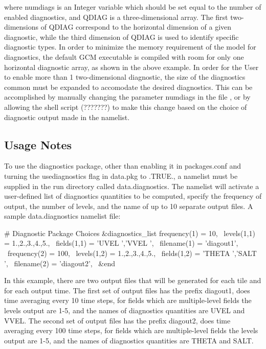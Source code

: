 where numdiags is an Integer variable which should be
set equal to the number of enabled diagnostics, and QDIAG is a three-dimensional
array.  The first two-dimensions of QDIAG correspond to the horizontal dimension
of a given diagnostic, while the third dimension of QDIAG is used to identify
specific diagnostic types.
In order to minimize the memory requirement of the model for diagnostics,
the default GCM executable is compiled with room for only one horizontal
diagnostic array, as shown in the above example.  
In order for the User to enable more than 1 two-dimensional diagnostic,
the size of the diagnostics common must be expanded to accomodate the desired diagnostics.
This can be accomplished by manually changing the parameter numdiags in the
file , or by allowing the 
shell script (???????) to make this
change based on the choice of diagnostic output made in the namelist.

\subsection{Usage Notes}
\label{sec:diagnostics:usersguide}
To use the diagnostics package, other than enabling it in packages.conf
and turning the usediagnostics flag in data.pkg to .TRUE., a namelist
must be supplied in the run directory called data.diagnostics. The namelist
will activate a user-defined list of diagnostics quantities to be computed,
specify the frequency of output, the number of levels, and the name of
up to 10 separate output files. A sample data.diagnostics namelist file:

\# Diagnostic Package Choices
 \&diagnostics_list
  frequency(1) = 10, \
   levels(1,1) = 1.,2.,3.,4.,5., \
   fields(1,1) = 'UVEL    ','VVEL    ', \
   filename(1) = 'diagout1', \
  frequency(2) = 100, \
   levels(1,2) = 1.,2.,3.,4.,5., \
   fields(1,2) = 'THETA   ','SALT    ', \
   filename(2) = 'diagout2', \
 \&end \

In this example, there are two output files that will be generated
for each tile and for each output time. The first set of output files
has the prefix diagout1, does time averaging every 10 time steps,
for fields which are multiple-level fields the levels output are 1-5,
and the names of diagnostics quantities are UVEL and VVEL.
The second set of output files
has the prefix diagout2, does time averaging every 100 time steps,
for fields which are multiple-level fields the levels output are 1-5,
and the names of diagnostics quantities are THETA and SALT.

